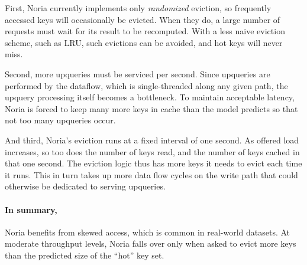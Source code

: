 First, Noria currently implements only \emph{randomized} eviction, so frequently
accessed keys will occasionally be evicted. When they do, a large number of
requests must wait for its result to be recomputed. With a less naive eviction
scheme, such as LRU, such evictions can be avoided, and hot keys will never
miss.

Second, more upqueries must be serviced per second. Since upqueries are
performed by the dataflow, which is single-threaded along any given path, the
upquery processing itself becomes a bottleneck. To maintain acceptable latency,
Noria is forced to keep many more keys in cache than the model predicts so that
not too many upqueries occur.

And third, Noria's eviction runs at a fixed interval of one second. As offered
load increases, so too does the number of keys read, and the number of keys
cached in that one second. The eviction logic thus has more keys it needs to
evict each time it runs. This in turn takes up more data flow cycles on the
write path that could otherwise be dedicated to serving upqueries.

\paragraph{In summary,} Noria benefits from skewed access, which is common in
real-world datasets. At moderate throughput levels, Noria falls over only when
asked to evict more keys than the predicted size of the ``hot'' key set.
